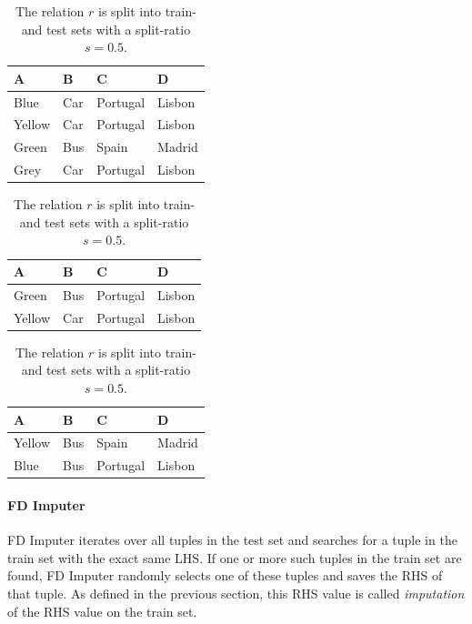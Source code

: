 \begin{table}[ht]
    \begin{subtable}[c]{0.9\textwidth}
        \centering
        \begin{tabular}{llll}
            \textsc{A} & \textsc{B} & \textsc{C} & \textsc{D} \\
        \toprule
        \toprule
        Blue & Car & Portugal & Lisbon \\
        Yellow & Car & Portugal & Lisbon  \\
        Green & Bus & Spain & Madrid  \\
        Grey & Car & Portugal & Lisbon  \\
        \bottomrule
        \bottomrule
        \end{tabular}
    \end{subtable}
    \begin{subtable}[c]{0.45\textwidth}
        \centering
        \begin{tabular}{llll}
            \textsc{A} & \textsc{B} & \textsc{C} & \textsc{D}  \\
        \toprule
        \toprule
            Green & Bus & Portugal & Lisbon \\
            Yellow & Car & Portugal & Lisbon \\
        \bottomrule
        \bottomrule
        \end{tabular}
    \end{subtable}
    \begin{subtable}[c]{0.45\textwidth}
        \centering
        \begin{tabular}{llll}
        \textsc{A} & \textsc{B} & \textsc{C} & \textsc{D} \\
        \toprule
        \toprule
        Yellow & Bus & Spain & Madrid \\
        Blue & Bus & Portugal & Lisbon \\
        \bottomrule
        \bottomrule
        \end{tabular}
    \end{subtable}
    \caption{The relation \( r \) is split into train- and test sets with a split-ratio \( s = 0.5 \). }
    \label{tab:split-example-fd-imputer}
\end{table}

\paragraph{FD Imputer} FD Imputer iterates over all tuples in the test set and searches for a tuple in the train set with the exact same LHS.
If one or more such tuples in the train set are found, FD Imputer randomly selects one of these tuples and saves the RHS of that tuple.
As defined in the previous section, this RHS value is called \emph{imputation} of the RHS value on the train set.

